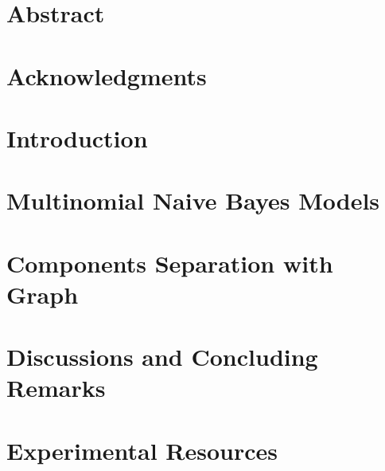 \documentclass[11pt, oneside]{book}
\begin{document}
{
	\restoregeometry
	
}	
	
	\frontmatter
	\setcounter{page}{2}
	\chapter*{Abstract}
	
	
	\chapter*{Acknowledgments}
	

{
	\hypersetup{linkcolor=black}
	\tableofcontents
	
	\listoffigures
	
	\listoftables
}

	\mainmatter

	\chapter{Introduction}
	
	
	\chapter{Multinomial Naive Bayes Models}
	\label{chapter 2}
	
	
	\chapter{Components Separation with Graph}
	
	
	\chapter{Discussions and Concluding Remarks}
	
	
	\appendix
	\chapter{Experimental Resources}
	\label{appx: Experiments Resources}
	

	
{
	\hypersetup{linkcolor=black}
	\printbibliography
}
\end{document}
